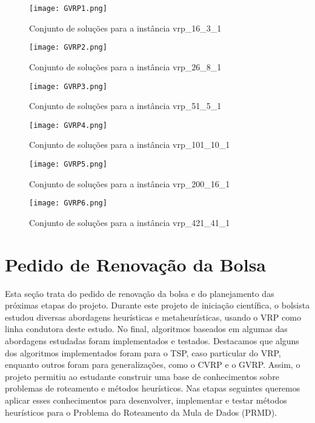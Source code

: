 \documentclass[12pt, a4paper]{article}
\begin{document}
\begin{figure}[htb!]
\centering
\texttt{[image: GVRP1.png]}
\caption{Conjunto de soluções para a instância vrp\_16\_3\_1}
\label{fig:gvrp}
\end{figure}

\begin{figure}[htb!]
\centering
\texttt{[image: GVRP2.png]}
\caption{Conjunto de soluções para a instância vrp\_26\_8\_1}
\label{fig:gvrp2}
\end{figure}

\begin{figure}[htb!]
\centering
\texttt{[image: GVRP3.png]}
\caption{Conjunto de soluções para a instância vrp\_51\_5\_1}
\label{fig:gvrp3}
\end{figure}

\begin{figure}[htb!]
\centering
\texttt{[image: GVRP4.png]}
\caption{Conjunto de soluções para a instância vrp\_101\_10\_1}
\label{fig:gvrp4}
\end{figure}

\begin{figure}[htb!]
\centering
\texttt{[image: GVRP5.png]}
\caption{Conjunto de soluções para a instância vrp\_200\_16\_1}
\label{fig:gvrp5}
\end{figure}

\begin{figure}[htb!]
\centering
\texttt{[image: GVRP6.png]}
\caption{Conjunto de soluções para a instância vrp\_421\_41\_1}
\label{fig:gvrp6}
\end{figure}


\section{Pedido de Renovação da Bolsa}\label{sec:pror}

Esta seção trata do pedido de renovação da bolsa e do planejamento das próximas etapas do projeto. Durante este projeto de iniciação científica, o bolsista estudou diversas abordagens heurísticas e metaheurísticas, usando o VRP como linha condutora deste estudo. No final, algoritmos baseados em algumas das abordagens estudadas foram implementados e testados. Destacamos que alguns dos algoritmos implementados foram para o TSP, caso particular do VRP, enquanto outros foram para generalizações, como o CVRP e o GVRP. Assim, o projeto permitiu ao estudante construir uma base de conhecimentos sobre problemas de roteamento e métodos heurísticos. Nas etapas seguintes queremos aplicar esses conhecimentos para desenvolver, implementar e testar métodos heurísticos para o Problema do Roteamento da Mula de Dados (PRMD).
\end{document}
